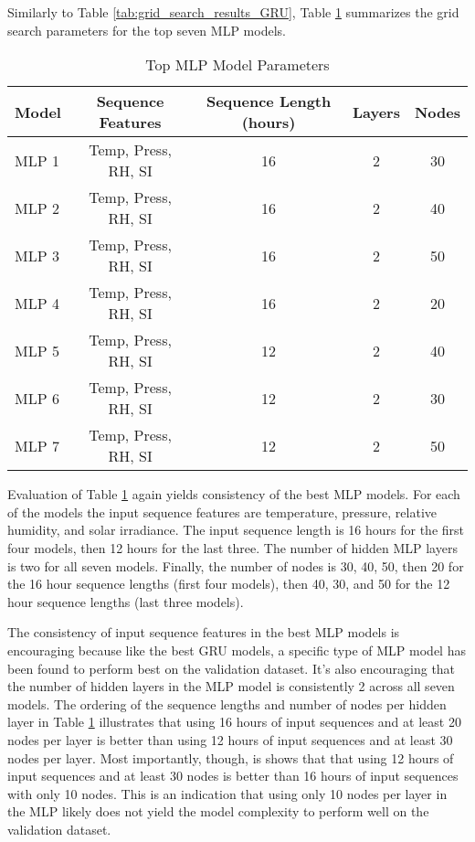Similarly to Table \ref{tab:grid_search_results_GRU}, Table \ref{tab:grid_search_results_MLP} summarizes the grid search parameters for the top seven MLP models.
\begin{table}[h!]
	\begin{center}
		\caption{Top MLP Model Parameters}
		\label{tab:grid_search_results_MLP}
		\begin{tabular}{||l|c|c|c|c||}
			\hline
			Model & Sequence Features & Sequence Length (hours) & Layers & Nodes \\
			\hline
			\hline
			MLP 1 & Temp, Press, RH, SI & 16 & 2 & 30 \\
			\hline
			MLP 2 & Temp, Press, RH, SI & 16 & 2 & 40 \\
			\hline
			MLP 3 & Temp, Press, RH, SI & 16 & 2 & 50 \\
			\hline
			MLP 4 & Temp, Press, RH, SI & 16 & 2 & 20 \\
			\hline
			MLP 5 & Temp, Press, RH, SI & 12 & 2 & 40 \\
			\hline
			MLP 6 & Temp, Press, RH, SI & 12 & 2 & 30 \\
			\hline
			MLP 7 & Temp, Press, RH, SI & 12 & 2 & 50 \\
			\hline
		\end{tabular}
	\end{center}
\end{table}
Evaluation of Table \ref{tab:grid_search_results_MLP} again yields consistency of the best MLP models. For each of the models the input sequence features are temperature, pressure, relative humidity, and solar irradiance. The input sequence length is 16 hours for the first four models, then 12 hours for the last three. The number of hidden MLP layers is two for all seven models. Finally, the number of nodes is 30, 40, 50, then 20 for the 16 hour sequence lengths (first four models), then 40, 30, and 50 for the 12 hour sequence lengths (last three models).

The consistency of input sequence features in the best MLP models is encouraging because like the best GRU models, a specific type of MLP model has been found to perform best on the validation dataset. It's also encouraging that the number of hidden layers in the MLP model is consistently 2 across all seven models. The ordering of the sequence lengths and number of nodes per hidden layer in Table \ref{tab:grid_search_results_MLP} illustrates that using 16 hours of input sequences and at least 20 nodes per layer is better than using 12 hours of input sequences and at least 30 nodes per layer. Most importantly, though, is shows that that using 12 hours of input sequences and at least 30 nodes is better than 16 hours of input sequences with only 10 nodes. This is an indication that using only 10 nodes per layer in the MLP likely does not yield the model complexity to perform well on the validation dataset.


